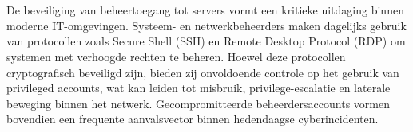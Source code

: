 
%
%
%
%
%

%



\chapter*{}

De beveiliging van beheertoegang tot servers vormt een kritieke uitdaging binnen moderne IT-omgevingen. Systeem- en netwerkbeheerders maken dagelijks gebruik van protocollen zoals Secure Shell (SSH) en Remote Desktop Protocol (RDP) om systemen met verhoogde rechten te beheren. Hoewel deze protocollen cryptografisch beveiligd zijn, bieden zij onvoldoende controle op het gebruik van privileged accounts, wat kan leiden tot misbruik, privilege-escalatie en laterale beweging binnen het netwerk. Gecompromitteerde beheerdersaccounts vormen bovendien een frequente aanvalsvector binnen hedendaagse cyberincidenten.

